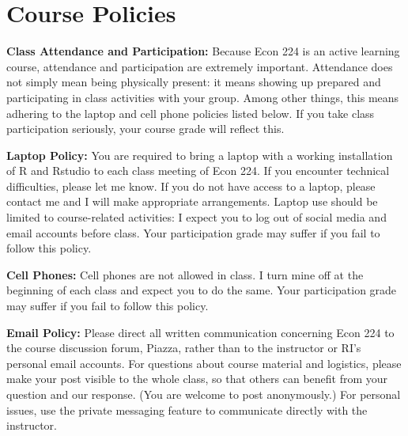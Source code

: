 \documentclass[11pt, letterpaper]{article}
\begin{document}
\section*{Course Policies}


\noindent \textbf{Class Attendance and Participation:}
Because Econ 224 is an active learning course, attendance and participation are extremely important. 
Attendance does not simply mean being physically present: it means showing up prepared and participating in class activities with your group.
Among other things, this means adhering to the laptop and cell phone policies listed below.
If you take class participation seriously, your course grade will reflect this.


\medskip

\noindent \textbf{Laptop Policy:} You are required to bring a laptop with a working installation of R and Rstudio to each class meeting of Econ 224.
If you encounter technical difficulties, please let me know.
If you do not have access to a laptop, please contact me and I will make appropriate arrangements.
Laptop use should be limited to course-related activities: I expect you to log out of social media and email accounts before class.
Your participation grade may suffer if you fail to follow this policy.

\medskip

\noindent \textbf{Cell Phones:} Cell phones are not allowed in class. 
I turn mine off at the beginning of each class and expect you to do the same.
Your participation grade may suffer if you fail to follow this policy.

\medskip

\noindent \textbf{Email Policy:}
Please direct all written communication concerning Econ 224 to the course discussion forum, Piazza, rather than to the instructor or RI's personal email accounts.
For questions about course material and logistics, please make your post visible to the whole class, so that others can benefit from your question and our response.
(You are welcome to post anonymously.)
For personal issues, use the private messaging feature to communicate directly with the instructor. 
\end{document}
